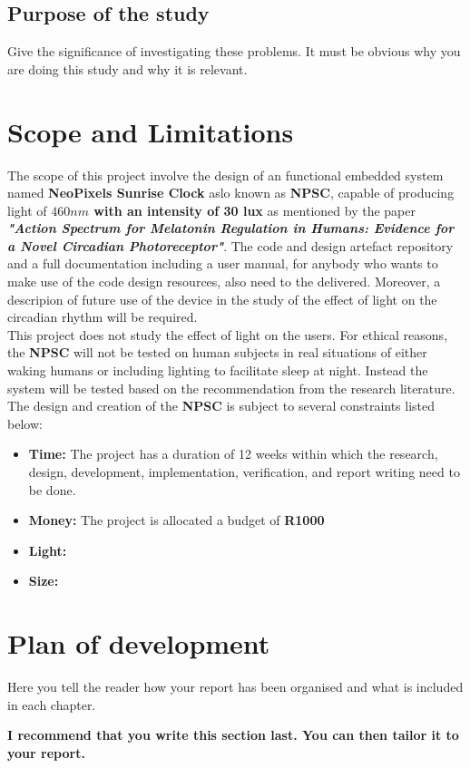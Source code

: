 \subsection{Purpose of the study}
Give the significance of investigating these problems. It must be obvious why you are doing this study
and why it is relevant.

\section{Scope and Limitations}
The scope of this project involve the design of an functional embedded system named \textbf{NeoPixels Sunrise Clock} aslo known as \textbf{NPSC}, capable of producing light of \textbf{\( 460nm\) with an intensity of 30 lux} as mentioned by the paper \textit{\textbf{"Action Spectrum for Melatonin Regulation in Humans: Evidence for a Novel Circadian Photoreceptor"}}. The code and design artefact repository and a full documentation including a user manual, for anybody who wants to make use of the code design resources, also need to the delivered. Moreover, a descripion of future use of the device in the study of the effect of light on the circadian rhythm will be required.\\
This project does not study the effect of light on the users. For ethical reasons, the \textbf{NPSC} will not be tested  on human subjects in real situations of either waking humans or including lighting to facilitate sleep at night. Instead the system will be tested based on the recommendation from the research  literature.\\
The design and creation of the \textbf{NPSC} is subject to several constraints listed below:
\begin{itemize}
\item \textbf{Time:} The project has a duration of 12 weeks within which the research, design, development, implementation, verification, and report writing need to be done.
\item \textbf{Money:}  The project is allocated a budget of \textbf{R1000}
\item \textbf{Light:} 
\item \textbf{Size:}  
\end{itemize}
\section{Plan of development}
Here you tell the reader how your report has been organised and what is included in each
chapter.

{\bf I recommend that you write this section last. You can then tailor it to your report.}

